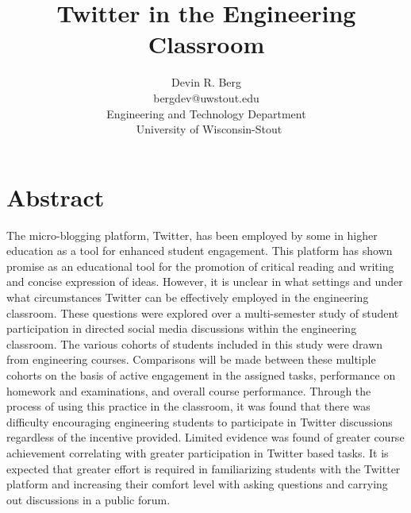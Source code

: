 \documentclass[12pt]{article}
\title{\large \textbf{Twitter in the Engineering Classroom}} %
\author{\vspace{-5ex}}
\author{\normalsize Devin R. Berg\\
\normalsize bergdev@uwstout.edu\\
\normalsize Engineering and Technology Department\\\
\normalsize University of Wisconsin-Stout}
\date{\vspace{-5ex}} %
\begin{document}
\raggedright
\maketitle
\thispagestyle{empty}
\pagestyle{empty}

\section*{Abstract}
The micro-blogging platform, Twitter, has been employed by some in higher education as a tool for enhanced student engagement. This platform has shown promise as an educational tool for the promotion of critical reading and writing and concise expression of ideas. However, it is unclear in what settings and under what circumstances Twitter can be effectively employed in the engineering classroom. These questions were explored over a multi-semester study of student participation in directed social media discussions within the engineering classroom. The various cohorts of students included in this study were drawn from engineering courses. Comparisons will be made between these multiple cohorts on the basis of active engagement in the assigned tasks, performance on homework and examinations, and overall course performance. Through the process of using this practice in the classroom, it was found that there was difficulty encouraging engineering students to participate in Twitter discussions regardless of the incentive provided. Limited evidence was found of greater course achievement correlating with greater participation in Twitter based tasks. It is expected that greater effort is required in familiarizing students with the Twitter platform and increasing their comfort level with asking questions and carrying out discussions in a public forum.
\end{document}
